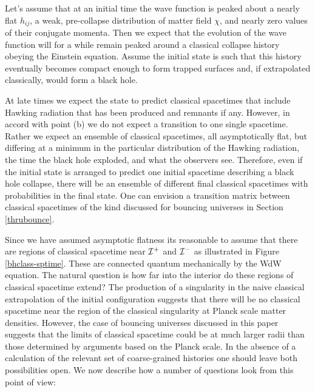 \documentclass[prd,floats,superscriptaddress,eqsecnum,floatfix,nofootinbib,12pt]{revtex4}
\def\scrip{{\cal I}^+}
\def\hij{h_{ij}}
\def\scrim{{\cal I}^-}
\def\scrim{{\cal I}^-}
\def\jf{}
\def\kf{}
\begin{document}
{{{{Let's assume that at an initial time the wave function is peaked about a nearly flat $\hij$, a weak, pre-collapse distribution of matter field $\chi$, and nearly zero values of their conjugate momenta. Then we expect that the evolution of the wave function will  for a while remain peaked around a classical collapse history obeying the Einstein equation. Assume the initial state is such that this history eventually becomes compact enough to form trapped surfaces and, if extrapolated classically, would form a black hole. 

At late times we expect the state to predict classical spacetimes that include Hawking radiation that has been produced and remnants if any. However, in accord with point (b) we do not expect a transition to one single spacetime. Rather we expect an ensemble of classical spacetimes, all asymptotically flat, but differing at a minimum in the particular distribution of the Hawking radiation, the time the black hole exploded, and what the observers see. 
Therefore, even if the initial state is arranged to predict one initial spacetime describing a black hole collapse,  there will be an ensemble of  different  final classical spacetimes with probabilities in the final state. {\jf One can envision} a transition matrix between classical spacetimes of the kind discussed for bouncing universes  in Section \ref{thrubounce}. 

{\kf Since we have assumed asymptotic flatness its reasonable to assume that there}  are regions of classical spacetime near $\scrip$ and $\scrim$  as illustrated in Figure \ref{bhclass-sptime}. These are connected quantum mechanically  by the WdW equation. The natural question is how far into the interior do these regions of classical spacetime extend? The production of a singularity in the naive classical extrapolation of the initial configuration suggests that {\kf there will be no classical spacetime}  near the region of the classical singularity  at Planck scale matter densities. However, the case of bouncing universes discussed in this paper suggests that {\kf the limits of classical spacetime could be}  at much larger radii than those determined by arguments based on the Planck scale. In the absence of a calculation of the relevant set of coarse-grained histories one should leave both possibilities open. We now describe how a number of questions look from this point of view:


}}}}
\end{document}
